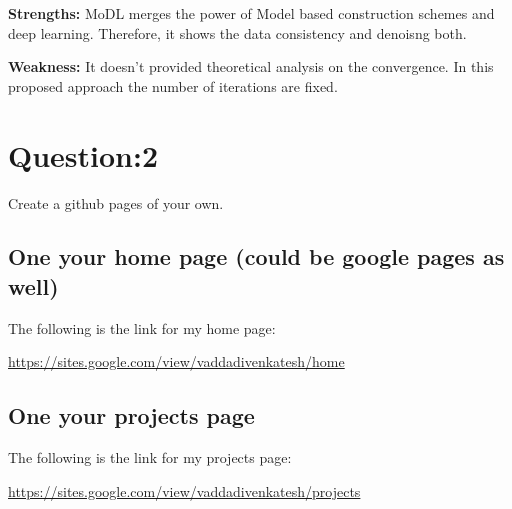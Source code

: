 \documentclass{article}
\begin{document}
\textbf{Strengths:}
MoDL merges the power of Model based construction schemes and deep learning. Therefore, it shows the data consistency and denoisng both.

\textbf{Weakness:}
It doesn't provided theoretical analysis on the convergence. In this proposed approach the number of iterations are fixed.
\section{Question:2}
Create a github pages of your own.
\subsection{One your home page (could be google pages as well)}
The following is the link for my home page:

\href{https://sites.google.com/view/vaddadivenkatesh/home}{https://sites.google.com/view/vaddadivenkatesh/home}
\subsection{One your projects page}
The following is the link for my projects page:

\href{https://sites.google.com/view/vaddadivenkatesh/projects}{https://sites.google.com/view/vaddadivenkatesh/projects}


\end{document}
